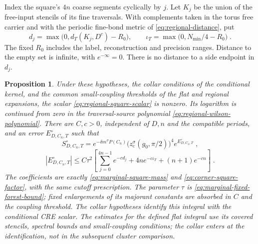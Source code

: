 \documentclass[11pt]{article}
\newtheorem{proposition}{Proposition}
\begin{document}
Index the square's $4n$ coarse segments cyclically by $j$. Let $K_j$ be the union of the free-input stencils of its fine traversals. With complements taken in the torus free carrier and with the periodic fine-bond metric of \eqref{eq:regional-distance}, put
\begin{equation}\label{eq:regional-square-distances}
    d_j=\max\bigl(0,d_T(K_j,D^c)-R_0\bigr),
    \qquad \iota_T=\max\bigl(0,N_{\min}/4-R_0\bigr)\;.
\end{equation}
The fixed $R_0$ includes the label, reconstruction and precision ranges. Distance to the empty set is infinite, with $e^{-\infty}=0$. There is no distance to a side endpoint in $d_j$.

\begin{proposition}\label{prop:regional-square-extraction}
Under these hypotheses, the collar conditions of the conditional kernel, and the common small-coupling thresholds of the flat and regional expansions, the scalar \eqref{eq:regional-square-scalar} is nonzero. Its logarithm is continued from zero in the traversal-source polynomial \eqref{eq:regional-wilson-polynomial}. There are $C,c>0$, independent of $D,n$ and the compatible periods, and an error $E^\circ_{D,C_n,T}$ such that
\begin{equation}\label{eq:regional-square-extraction}
    S^\circ_{D,C_n,T}
        =e^{-\delta m^\sigma P(C_n)}
          \bigl(z_{\mathrm c}^\sigma(g_0,\pi/2)\bigr)^4
          e^{E^\circ_{D,C_n,T}}\;,
\end{equation}
\begin{equation}\label{eq:regional-square-error}
    |E^\circ_{D,C_n,T}|
        \leq C\tau^2\left[
            \sum_{j=0}^{4n-1}e^{-cd_j}
            +4ne^{-c\iota_T}+(n+1)e^{-cn}\right]\;.
\end{equation}
The coefficients are exactly \eqref{eq:marginal-square-mass} and \eqref{eq:corner-square-factor}, with the same cutoff prescription. The parameter $\tau$ is \eqref{eq:marginal-fixed-forest-bound}; fixed enlargements of its majorant constants are absorbed in $C$ and the coupling threshold.
The collar hypotheses identify this integral with the conditional CRE scalar. The estimates for the defined flat integral use its covered stencils, spectral bounds and small-coupling conditions; the collar enters at the identification, not in the subsequent cluster comparison.
\end{proposition}
\end{document}
